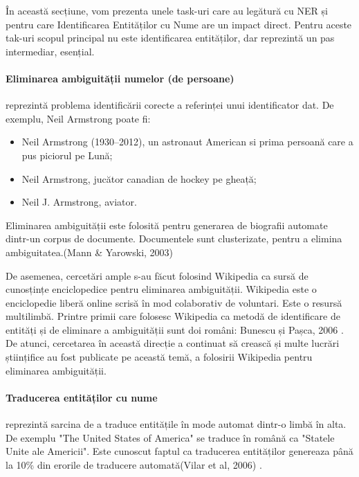 În această secțiune, vom prezenta unele task-uri care au legătură cu NER și pentru care Identificarea Entităților cu Nume are un impact direct. Pentru aceste tak-uri scopul principal nu este identificarea entităților, dar reprezintă un pas intermediar, esențial.

\paragraph{Eliminarea ambiguității numelor (de persoane)}

reprezintă problema identificării corecte a referinței unui identificator dat. De exemplu, Neil Armstrong poate fi:

\begin{itemize}
\item Neil Armstrong (1930–2012), un astronaut American si prima persoană care a pus piciorul pe Lună;
\item Neil Armstrong, jucător canadian de hockey pe gheață;
\item Neil J. Armstrong, aviator.
\end{itemize}

Eliminarea ambiguității este folosită pentru generarea de biografii automate dintr-un corpus de documente. Documentele sunt clusterizate, pentru a elimina ambiguitatea.(Mann \& Yarowski, 2003)\cite{Mann03unsupervisedpersonal}

De asemenea, cercetări ample s-au făcut folosind Wikipedia ca sursă de cunosțințe enciclopedice pentru eliminarea ambiguității. Wikipedia este o enciclopedie liberă online scrisă în mod colaborativ de voluntari. Este o resursă multilimbă. Printre primii care folosesc Wikipedia ca metodă de identificare de entități și de eliminare a ambiguității sunt doi români: Bunescu și Pașca, 2006 \cite{Bunescu06usingencyclopedic}. De atunci, cercetarea în această direcție a continuat să crească și multe lucrări științifice au fost publicate pe această temă, a folosirii Wikipedia pentru eliminarea ambiguității.

\paragraph{Traducerea entităților cu nume}

reprezintă sarcina de a traduce entitățile în mode automat dintr-o limbă în alta. De exemplu "The United States of America" se traduce în română ca "Statele Unite ale Americii". Este cunoscut faptul ca traducerea entităților genereaza până la 10\% din erorile de traducere automată(Vilar et al, 2006) \cite{vilar2006}.

